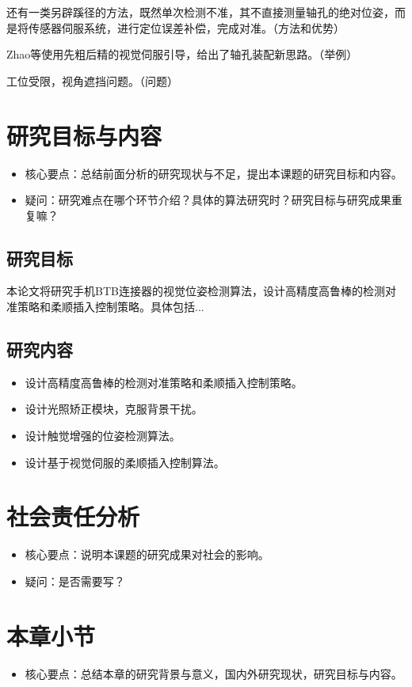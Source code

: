 \documentclass{Diploma}
\begin{document}
还有一类另辟蹊径的方法，既然单次检测不准，其不直接测量轴孔的绝对位姿，而是将传感器伺服系统，进行定位误差补偿，完成对准。（方法和优势）

Zhao等使用先粗后精的视觉伺服引导，给出了轴孔装配新思路。（举例）

工位受限，视角遮挡问题。（问题）
\section{研究目标与内容}
\begin{itemize}
  \item 核心要点：总结前面分析的研究现状与不足，提出本课题的研究目标和内容。
  \item 疑问：研究难点在哪个环节介绍？具体的算法研究时？研究目标与研究成果重复嘛？
\end{itemize}

\subsection{研究目标}
本论文将研究手机BTB连接器的视觉位姿检测算法，设计高精度高鲁棒的检测对准策略和柔顺插入控制策略。具体包括...
\subsection{研究内容}
\begin{itemize}
  \item 设计高精度高鲁棒的检测对准策略和柔顺插入控制策略。
  \item 设计光照矫正模块，克服背景干扰。
  \item 设计触觉增强的位姿检测算法。
  \item 设计基于视觉伺服的柔顺插入控制算法。
\end{itemize}
\section{社会责任分析}
\begin{itemize}
  \item 核心要点：说明本课题的研究成果对社会的影响。
  \item 疑问：是否需要写？
\end{itemize}
\section{本章小节}
\begin{itemize}
  \item 核心要点：总结本章的研究背景与意义，国内外研究现状，研究目标与内容。
\end{itemize}
\end{document}
